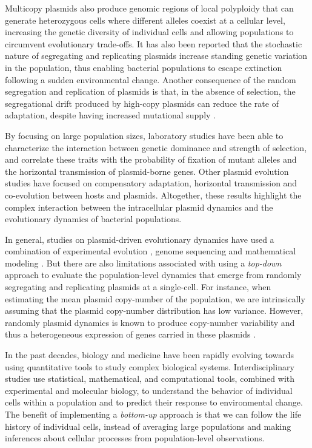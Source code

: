 \documentclass[fleqn,12pt]{wlscirep}
\begin{document}
Multicopy plasmids also produce genomic regions of local polyploidy that can generate heterozygous cells where different alleles coexist at a cellular level, increasing the genetic diversity of individual cells and allowing populations to circumvent evolutionary trade-offs\cite{Rodriguez2018}.
It has also been reported that the stochastic nature of segregating and replicating plasmids increase standing genetic variation in the population, thus enabling bacterial populations to escape extinction following a sudden environmental change\cite{santer2019evolutionary}.  
Another consequence of the random segregation and replication of plasmids is that, in the absence of selection, the segregational drift produced by high-copy plasmids can reduce the rate of adaptation, despite having increased mutational supply \cite{Ilhan2019}.

By focusing on large population sizes, laboratory studies have been able to characterize the interaction between genetic dominance and strength of selection, and correlate these traits with the probability of fixation of mutant alleles and the horizontal transmission of plasmid-borne genes\cite{rodriguez2019genetic}.
Other plasmid evolution studies have focused on compensatory adaptation\cite{SanMillan2014,Wein2019,hall2020extremely}, horizontal transmission\cite{Lopatkin2017} and co-evolution between hosts and plasmids\cite{Harrison2015}.
Altogether, these results highlight the complex interaction between the intracellular plasmid dynamics and the evolutionary dynamics of bacterial populations. 

In general, studies on plasmid-driven evolutionary dynamics have used a combination of experimental evolution \cite{maclean2015,harrison2012,holloway2007}, genome sequencing \cite{Harrison2015,SanMillan2014,porse2016survival} and mathematical modeling \cite{SanMillan2014,Wein2019,santer2019evolutionary,yurtsev2013bacterial,stewart1977population}.
But there are also limitations associated with using a {\em top-down} approach to evaluate the population-level dynamics that emerge from randomly segregating and replicating plasmids at a single-cell.
For instance, when estimating the mean plasmid copy-number of the population, we are intrinsically assuming that the plasmid copy-number distribution has low variance. However, randomly plasmid dynamics is known to produce copy-number variability and thus a heterogeneous expression of genes carried in these plasmids \cite{jahn2016copy,Munch2019}. 

In the past decades, biology and medicine have been rapidly evolving towards using quantitative tools to study complex biological systems. Interdisciplinary studies use statistical, mathematical, and computational tools, combined with experimental and molecular biology, to understand the behavior of individual cells within a population \cite{artemova2015isolated,ref} and to predict their response to environmental change\cite{el2018heterogeneity,ref}. The benefit of implementing a {\em bottom-up} approach is that we can follow the life history of individual cells, instead of averaging large populations and making inferences about cellular processes from population-level observations.
\end{document}
